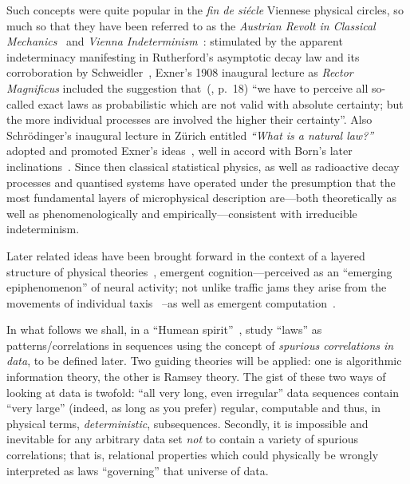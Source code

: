 \documentclass[12pt]{article}
\begin{document}
Such concepts were quite popular in the  {\it fin de si\'ecle} Viennese physical circles, so much so
that they have been referred to as
the {\em Austrian Revolt in Classical Mechanics}~\cite{Hiebert2000} and
{\em Vienna Indeterminism}~\cite{Stoeltzner1999}: stimulated by
the apparent indeterminacy manifesting  in Rutherford's asymptotic decay law
and its corroboration  by Schweidler~\cite{schweidler-1905},
Exner's 1908 inaugural lecture as {\it Rector Magnificus}
included the suggestion that~(\cite[]{Exner-1908}, p.~18)  ``we have
to perceive all so-called exact laws as probabilistic which are not valid with
absolute certainty; but the more individual processes are involved the higher their certainty''.
Also Schr\"odinger's inaugural lecture in Z\"urich entitled {\em ``What is a natural law?''}
adopted and promoted Exner's ideas~\cite{schrodinger-1929,book:16081},
well in accord with Born's later inclinations~\cite{born-26-1}.
Since then classical statistical physics, as well as radioactive decay processes
and quantised systems have operated under the presumption that
the most fundamental layers of microphysical description
are---both theoretically as well as phenomenologically and empirically---consistent with irreducible indeterminism.

Later related ideas have been brought forward in the context of
a layered structure of physical theories~\cite{anderson:73},
emergent  cognition---perceived as an ``emerging epiphenomenon'' of neural activity;
not unlike traffic jams they arise  from the movements of individual taxis~\cite{hofstadter:82}
--as well as emergent computation~\cite{Stephani-1990}.



In what follows we shall,
in a ``Humean spirit''~\cite{Hume-Treatise},
study  ``laws'' as  patterns/correlations  in sequences using  the concept of {\em spurious
correlations in data}, to be defined  later.
Two guiding theories will be applied: one is algorithmic information theory, the other is Ramsey theory.
The gist of these two ways of looking at data is twofold: ``all very long, even irregular'' data sequences
contain ``very large'' (indeed, as long as you prefer) regular,
computable and thus, in physical terms, {\em deterministic}, subsequences.
Secondly,
it is impossible and inevitable for any arbitrary data set {\em not} to contain a variety of spurious correlations; that is,
relational properties which could physically be  wrongly  interpreted as
laws ``governing'' that universe of data.
\end{document}
